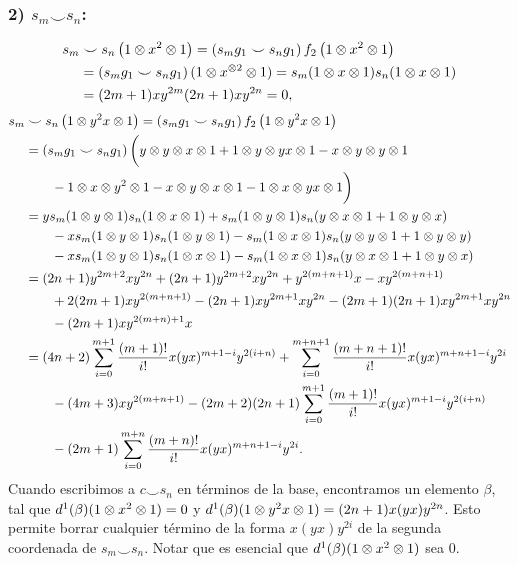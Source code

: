 \documentclass[fleqn,../tesis.tex]{subfiles}
\begin{document}
\subsubsection{2) $s_m \smile s_n$:}
\begin{align*}
	s_m &\smile s_n\left(1\otimes x^{2} \otimes 1\right) = \left(s_m g_1 \smile s_n g_1\right)f_2\left(1\otimes x^2 \otimes 1\right)\\
	&= \left(s_m g_1 \smile s_n g_1\right)(1 \otimes x^{\otimes 2}\otimes 1) = s_m(1\otimes x \otimes 1)s_n(1 \otimes x \otimes 1)\\
	&= (2m + 1)xy^{2m} (2n + 1)xy^{2n} = 0,
\end{align*}
\begin{align*}
	s_m &\smile s_n\left(1\otimes y^2x \otimes 1\right) = \left(s_m g_1 \smile s_n g_1\right)f_2\left(1\otimes y^2x \otimes 1\right)\\
	&= \left(s_m g_1 \smile s_n g_1\right)\bigg(y \otimes y \otimes x \otimes 1 + 1 \otimes y \otimes yx \otimes 1 
		- x \otimes y \otimes y \otimes 1\\ &\qquad - 1\otimes x \otimes y^2 \otimes 1 - x \otimes y \otimes x \otimes 1 
		- 1\otimes x \otimes yx \otimes 1\bigg) \\
	&= y s_m(1 \otimes y \otimes 1)s_n(1 \otimes x \otimes 1) + s_m(1\otimes y \otimes 1)s_n(y \otimes x \otimes 1 + 1 \otimes y \otimes x)\\
	&\qquad -xs_m(1\otimes y \otimes 1)s_n(1 \otimes y \otimes 1) -s_m(1\otimes x \otimes 1)s_n(y \otimes y \otimes 1 + 1\otimes y \otimes y)\\
	&\qquad -xs_m(1\otimes y \otimes 1)s_n(1 \otimes x \otimes 1) -s_m(1\otimes x \otimes 1)s_n(y \otimes x \otimes 1 + 1\otimes y \otimes x)\\
	&= (2n + 1)y^{2m + 2}xy^{2n} + (2n + 1)y^{2m + 2}xy^{2n} + y^{2(m + n + 1)}x - xy^{2(m + n + 1)}\\
	&\qquad + 2(2m + 1)xy^{2(m + n + 1)} - (2n + 1)xy^{2m + 1}xy^{2n} - (2m + 1)(2n + 1)xy^{2m + 1}xy^{2n}\\
	&\qquad -(2m + 1)xy^{2(m + n) + 1}x\\
	&=(4n + 2)\sum_{i = 0}^{m + 1}\frac{(m + 1)!}{i!}x(yx)^{m + 1 - i}y^{2(i + n)}
		+\sum_{i = 0}^{m + n + 1}\frac{(m + n + 1)!}{i!}x(yx)^{m + n + 1 - i}y^{2i}\\
	&\qquad -(4m + 3)xy^{2(m + n + 1)}
		- (2m + 2)(2n + 1)\sum_{i = 0}^{m + 1}\frac{(m + 1)!}{i!}x(yx)^{m + 1 - i}y^{2(i + n)}\\
	&\qquad -(2m + 1)\sum_{i = 0}^{m + n}\frac{(m + n)!}{i!}x(yx)^{m + n + 1 - i}y^{2i}.
\end{align*}
Cuando escribimos a $c\smile s_n$ en términos de la base, encontramos un elemento
$\beta$, tal que $d^1(\beta)(1\otimes x^2\otimes 1) = 0$
y $d^1(\beta)(1\otimes y^2x\otimes 1) = (2n + 1)x(yx)y^{2n}$. Esto permite borrar cualquier término de la forma
$x(yx)y^{2i}$ de la segunda coordenada de $s_m \smile s_n$. Notar que es esencial que $d^1(\beta)(1\otimes x^2\otimes 1)$ sea $0$.
\end{document}
